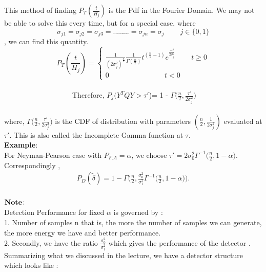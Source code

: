\documentclass[a4paper,english,12pt]{article}
\begin{document}
 This method of finding $P_T(\frac{t}{H_j})$ is the Pdf in the Fourier Domain. We may not be able to solve this every time, but for a special case, where
 \begin{equation*}
 \sigma_{j1}=\sigma_{j2}=\sigma_{j3}=........=\sigma_{jn}=\sigma_{j} \ \ \ \ \ \ \ \ \ \ j\in\{0,1\}
 \end{equation*} , we can find this quantity.\\
 \begin{equation*}
 P_T(\frac{t}{H_j})=
 \begin{cases}
 	\frac{1}{(2\sigma_j^2)^\frac{n}{2}}\frac{1}{\Gamma(\frac{n}{2})}t^{(\frac{n}{2}-1)}e^\frac{-t}{2\sigma_j^2} \ \ \ \ \ \ \ \ \ \ t\ge0\\
 	0 \ \ \ \ \ \ \ \ \ \ \ \ \ \ \ \ \ \ \ \ \ \ \ \ \ \ \ \ \ \ \ \ \ \ \ t<0
 	\end{cases}
 	\end{equation*}\\
 	\ \ \ \ \ \ \ \ \ \ \ \ \ \ \ \ \ \ \ Therefore, $P_j(Y^TQY>\tau'$)= 1 - $\Gamma\bigg(\frac{n}{2},\frac{\tau'}{2\sigma_j^2}\bigg)$\\
 	\\where, $\Gamma\bigg(\frac{n}{2},\frac{\tau'}{2\sigma_j^2}\bigg)$ is the CDF of  distribution with parameters $(\frac{n}{2},\frac{1}{2\sigma_j^2})$ evaluated at $\tau'$. This is also called the Incomplete Gamma function at $\tau$.
 	\\\textbf{Example}:\\
 	For Neyman-Pearson case with $P_{F.A}=\alpha$, we choose $\tau'= 2\sigma_{0}^{2}\Gamma^{-1}\bigg(\frac{n}{2},1-\alpha\bigg)$.
 	\\Correspondingly ,\\
 	\begin{align*}
 	P_D(\tilde{\delta})=1 - \Gamma\bigg(\frac{n}{2},\frac{\sigma_0^2}{\sigma_1^2}\Gamma^{-1}\bigg(\frac{n}{2},1-\alpha\bigg)\bigg).
 \end{align*}\\
 $\\\textbf{Note}\colon$\\
 Detection Performance for fixed $\alpha$ is governed by :\\
 1. Number of samples n that is, the more the number of samples we can generate, the more energy we have and better performance.\\
 2. Secondly, we have the ratio $\frac{\sigma_0^2}{\sigma_1^2}$ which gives the performance of the detector .
 \\ Summarizing what we discussed in the lecture, we have a detector structure which looks like :\\
\end{document}
